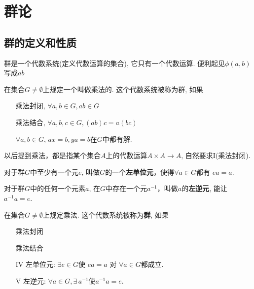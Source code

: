 \section{群论}

\subsection{群的定义和性质}

\begin{Remark}
群是一个代数系统(定义代数运算的集合), 它只有一个代数运算. 便利起见$\phi(a, b)$写成$a b$ 
\end{Remark}

\begin{Definition}
在集合$G \neq \emptyset$上规定一个叫做乘法的\;\;. 这个代数系统被称为群, 如果
\begin{itemize}
	\item[\uppercase\expandafter{\romannumeral1}] 乘法封闭, $\forall a, b \in G, ab \in G$
	\item[\uppercase\expandafter{\romannumeral2}] 乘法结合, $\forall a, b, c \in G, (ab)c = a(bc)$
	\item[\uppercase\expandafter{\romannumeral3}] $ \forall a, b \in G$, $ax = b, ya = b$在$G$中都有解.
\end{itemize}
\end{Definition}

\begin{Remark}[乘法]
以后提到乘法，都是指某个集合$A$上的代数运算$A \times A \rightarrow A$, 自然要求I(乘法封闭).
\end{Remark}

\begin{Theorem}[左单位元]
对于群$G$中至少有一个元$e$, 叫做$G$的一个\textbf{左单位元}，使得$\forall a \in G$都有 $ea = a$.
\end{Theorem}

\begin{Theorem}[左逆元]
对于群$G$中的任何一个元素$a$, 在$G$中存在一个元$a^{-1}$，叫做$a$的\textbf{左逆元}, 能让$a^{-1} a = e$.
\end{Theorem}

\begin{Definition}
在集合$G \neq \emptyset$上规定乘法. 这个代数系统被称为\textbf{群}, 如果
\begin{itemize}
	\item[\uppercase\expandafter{\romannumeral1}] 乘法封闭
	\item[\uppercase\expandafter{\romannumeral2}] 乘法结合
	\item[IV] 左单位元: $\exists e \in G$使 $ea =a$ 对 $\forall a \in G$都成立.
	\item[V] 左逆元: $\forall a \in G, \exists \, a^{-1}$使$a^{-1}a = e$.
\end{itemize}
\end{Definition}

